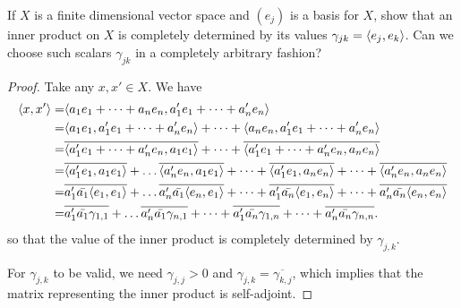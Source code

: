 \begin{exercise}{15}
If $X$ is a finite dimensional vector space and $(e_j)$ is a basis for $X$, show that an inner product on $X$ is completely determined by its values $\gamma_{jk}=\langle e_j,e_k\rangle$.
Can we choose such scalars $\gamma_{jk}$ in a completely arbitrary fashion?
\end{exercise}
\begin{proof}
Take any $x,x'\in X$.
We have 
\begin{align*}
    \langle x,x'\rangle
    =& \langle a_1e_1+\dots+a_ne_n, a_1'e_1+\dots+a_n'e_n\rangle\\
    =& \langle a_1e_1,a_1'e_1+\dots+a_n'e_n\rangle + \dots + \langle a_ne_n,a_1'e_1+\dots+a_n'e_n\rangle\\
    =& \overline{\langle a_1'e_1+\dots+a_n'e_n, a_1e_1\rangle} + \dots + \overline{\langle a_1'e_1+\dots+a_n'e_n, a_ne_n\rangle}\\
    =& \overline{\langle a_1'e_1, a_1e_1\rangle} + \dots \overline{\langle a_n'e_n, a_1e_1\rangle} + \dots + \overline{\langle a_1'e_1, a_ne_n\rangle} + \dots +
    \overline{\langle a_n'e_n, a_ne_n\rangle}\\
    =& \overline{a_1'\bar{a_1}\langle e_1, e_1\rangle} + \dots \overline{a_n'\bar{a_1}\langle e_n, e_1\rangle} + \dots + \overline{a_1'\bar{a_n}\langle e_1, e_n\rangle} + \dots +
    \overline{a_n'\bar{a_n}\langle e_n, e_n\rangle}\\
    =& \overline{a_1'\bar{a_1}\gamma_{1,1}} + \dots \overline{a_n'\bar{a_1}\gamma_{n,1}} + \dots + \overline{a_1'\bar{a_n}\gamma_{1,n}} + \dots +
    \overline{a_n'\bar{a_n}\gamma_{n,n}}.
\end{align*}
so that the value of the inner product is completely determined by $\gamma_{j,k}$.

For $\gamma_{j,k}$ to be valid, we need $\gamma_{j,j}>0$ and $\gamma_{j,k}=\overline{\gamma_{k,j}}$, which implies that the matrix representing the inner product is self-adjoint.
\end{proof}
